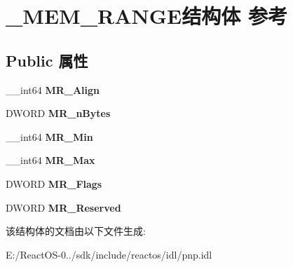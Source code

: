 \hypertarget{struct___m_e_m___r_a_n_g_e}{}\section{\+\_\+\+M\+E\+M\+\_\+\+R\+A\+N\+G\+E结构体 参考}
\label{struct___m_e_m___r_a_n_g_e}
\subsection*{Public 属性}
\begin{DoxyCompactItemize}
\item 
\mbox{\label{struct___m_e_m___r_a_n_g_e_ab016e73c250a245c8ff99db44912ff5d}} 
\+\_\+\+\_\+int64 {\bfseries M\+R\+\_\+\+Align}
\item 
\mbox{\label{struct___m_e_m___r_a_n_g_e_a0a158c740e38f295611ceb053fa6dbdb}} 
D\+W\+O\+RD {\bfseries M\+R\+\_\+n\+Bytes}
\item 
\mbox{\label{struct___m_e_m___r_a_n_g_e_a6eb5f644158b659f495a2c8025538856}} 
\+\_\+\+\_\+int64 {\bfseries M\+R\+\_\+\+Min}
\item 
\mbox{\label{struct___m_e_m___r_a_n_g_e_ae0817057551fc9768be0b30af4da7c4e}} 
\+\_\+\+\_\+int64 {\bfseries M\+R\+\_\+\+Max}
\item 
\mbox{\label{struct___m_e_m___r_a_n_g_e_ab278142582c40be2ea7d8fdd05eb6d9c}} 
D\+W\+O\+RD {\bfseries M\+R\+\_\+\+Flags}
\item 
\mbox{\label{struct___m_e_m___r_a_n_g_e_a11d1bb3c5a2640af12527d80cd5c08b3}} 
D\+W\+O\+RD {\bfseries M\+R\+\_\+\+Reserved}
\end{DoxyCompactItemize}


该结构体的文档由以下文件生成\+:\begin{DoxyCompactItemize}
\item 
E\+:/\+React\+O\+S-\/0../sdk/include/reactos/idl/pnp.\+idl\end{DoxyCompactItemize}

